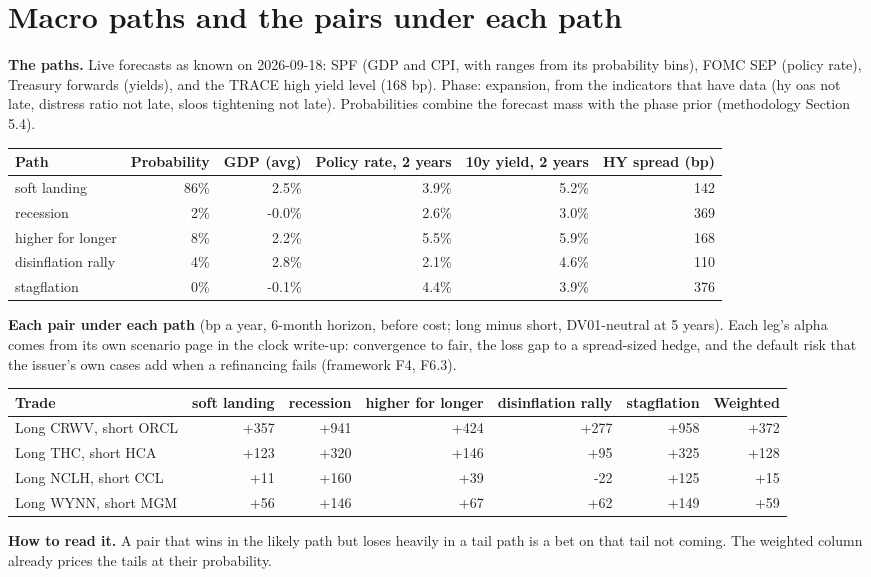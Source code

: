 \section{Macro paths and the pairs under each path}
\textbf{The paths.} Live forecasts as known on 2026-09-18: SPF (GDP and CPI, with ranges from its probability bins),
FOMC SEP (policy rate), Treasury forwards (yields), and the TRACE high yield level (168 bp). Phase: expansion,
from the indicators that have data (hy oas not late, distress ratio not late, sloos tightening not late). Probabilities combine the forecast mass with the phase prior (methodology Section 5.4).

\begin{center}\footnotesize\setlength{\tabcolsep}{4pt}
\begin{tabular}{@{}lrrrrr@{}}\toprule
Path & Probability & GDP (avg) & Policy rate, 2 years & 10y yield, 2 years & HY spread (bp) \\\midrule
soft landing & 86\% & 2.5\% & 3.9\% & 5.2\% & 142 \\
recession & 2\% & -0.0\% & 2.6\% & 3.0\% & 369 \\
higher for longer & 8\% & 2.2\% & 5.5\% & 5.9\% & 168 \\
disinflation rally & 4\% & 2.8\% & 2.1\% & 4.6\% & 110 \\
stagflation & 0\% & -0.1\% & 4.4\% & 3.9\% & 376 \\
\bottomrule
\end{tabular}
\end{center}

\textbf{Each pair under each path} (bp a year, 6-month horizon, before cost; long minus short, DV01-neutral at 5 years).
Each leg's alpha comes from its own scenario page in the clock write-up: convergence to fair, the loss gap to a spread-sized hedge,
and the default risk that the issuer's own cases add when a refinancing fails (framework F4, F6.3).

\begin{center}\footnotesize\setlength{\tabcolsep}{4pt}
\begin{tabular}{@{}lrrrrrr@{}}\toprule
Trade & soft landing & recession & higher for longer & disinflation rally & stagflation & Weighted \\\midrule
Long CRWV, short ORCL & +357 & +941 & +424 & +277 & +958 & +372 \\
Long THC, short HCA & +123 & +320 & +146 & +95 & +325 & +128 \\
Long NCLH, short CCL & +11 & +160 & +39 & -22 & +125 & +15 \\
Long WYNN, short MGM & +56 & +146 & +67 & +62 & +149 & +59 \\
\bottomrule
\end{tabular}
\end{center}
\textbf{How to read it.} A pair that wins in the likely path but loses heavily in a tail path is a bet on that tail not coming.
The weighted column already prices the tails at their probability.

